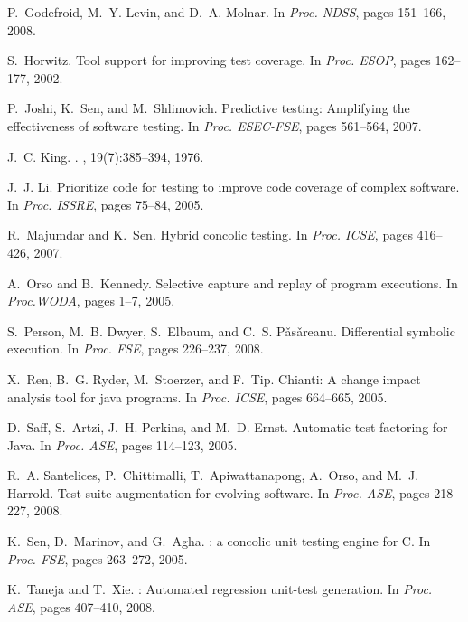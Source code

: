 \documentclass{sig-alternate}
\begin{document}
\begin{thebibliography}{10}
\begin{scriptsize}
P.~Godefroid, M.~Y. Levin, and D.~A. Molnar.
\newblock In {\em Proc. NDSS}, pages 151--166, 2008.

S.~Horwitz.
\newblock Tool support for improving test coverage.
\newblock In {\em Proc. ESOP}, pages 162--177, 2002.

P.~Joshi, K.~Sen, and M.~Shlimovich.
\newblock Predictive testing: Amplifying the effectiveness of software testing.
\newblock In {\em Proc. ESEC-FSE}, pages 561--564, 2007.

J.~C. King.
.
, 19(7):385--394, 1976.

J.~J. Li.
\newblock Prioritize code for testing to improve code coverage of complex
  software.
\newblock In {\em Proc. ISSRE}, pages 75--84, 2005.

R.~Majumdar and K.~Sen.
\newblock Hybrid concolic testing.
\newblock In {\em Proc. ICSE}, pages 416--426, 2007.

A.~Orso and B.~Kennedy.
\newblock Selective capture and replay of program executions.
\newblock In {\em Proc.WODA}, pages 1--7, 2005.

S.~Person, M.~B. Dwyer, S.~Elbaum, and C.~S. P\v{a}s\v{a}reanu.
\newblock Differential symbolic execution.
\newblock In {\em Proc. FSE}, pages 226--237, 2008.

X.~Ren, B.~G. Ryder, M.~Stoerzer, and F.~Tip.
\newblock Chianti: A change impact analysis tool for java programs.
\newblock In {\em Proc. ICSE}, pages 664--665, 2005.

D.~Saff, S.~Artzi, J.~H. Perkins, and M.~D. Ernst.
\newblock Automatic test factoring for {Java}.
\newblock In {\em Proc. ASE}, pages 114--123, 2005.

R.~A. Santelices, P.~Chittimalli, T.~Apiwattanapong, A.~Orso, and M.~J.
  Harrold.
\newblock Test-suite augmentation for evolving software.
\newblock In {\em Proc. ASE}, pages 218--227, 2008.

K.~Sen, D.~Marinov, and G.~Agha.
: a concolic unit testing engine for {C}.
\newblock In {\em Proc. FSE}, pages 263--272, 2005.

K.~Taneja and T.~Xie.
: Automated regression unit-test generation.
\newblock In {\em Proc. ASE}, pages 407--410, 2008.


\end{scriptsize}
\end{thebibliography}
\end{document}
